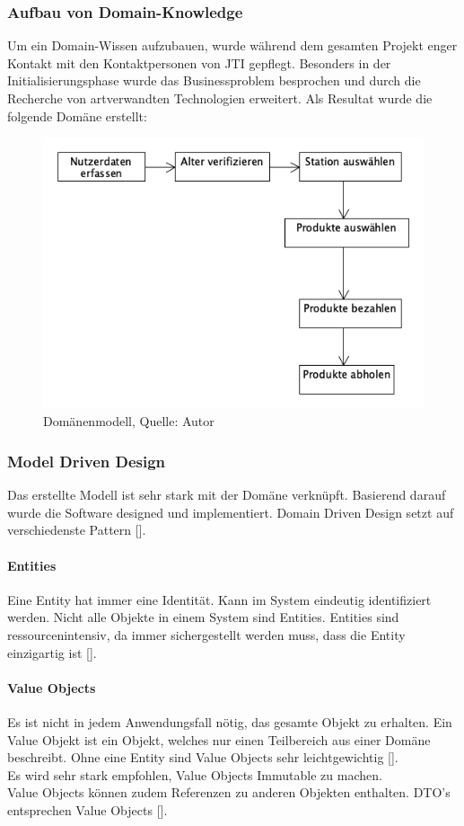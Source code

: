 \subsubsection{Aufbau von Domain-Knowledge}
Um ein Domain-Wissen aufzubauen, wurde während dem gesamten Projekt enger Kontakt mit den Kontaktpersonen von \ac{JTI} gepflegt. Besonders in der Initialisierungsphase wurde das Businessproblem besprochen und durch die Recherche von artverwandten Technologien erweitert. 
Als Resultat wurde die folgende Domäne erstellt: 
\begin{figure}[H]
	\centering
	\includegraphics[scale=0.5]{images/Domain.png}
	\caption[Domänenmodell]{Domänenmodell, Quelle: Autor}
	\label{img: domain}
\end{figure}

\subsubsection{Model Driven Design}
Das erstellte Modell ist sehr stark mit der Domäne verknüpft. Basierend darauf wurde die Software designed und implementiert. Domain Driven Design setzt auf verschiedenste Pattern [\cite{domainDrivenDesign}].
\paragraph{Entities}\label{entity}
Eine Entity hat immer eine Identität. Kann im System eindeutig identifiziert werden. Nicht alle Objekte in einem System sind Entities. Entities sind ressourcenintensiv, da immer sichergestellt werden muss, dass die Entity einzigartig ist [\cite{domainDrivenDesign}].
\paragraph{Value Objects}
Es ist nicht in jedem Anwendungsfall nötig, das gesamte Objekt zu erhalten. Ein Value Objekt ist ein Objekt, welches nur einen Teilbereich aus einer Domäne beschreibt. Ohne eine Entity sind Value Objects sehr leichtgewichtig [\cite{domainDrivenDesign}]. \\
Es wird sehr stark empfohlen, Value Objects Immutable zu machen. \\
Value Objects können zudem Referenzen zu anderen Objekten enthalten. \ac{DTO}'s entsprechen Value Objects [\cite{domainDrivenDesign}].
\newpage
